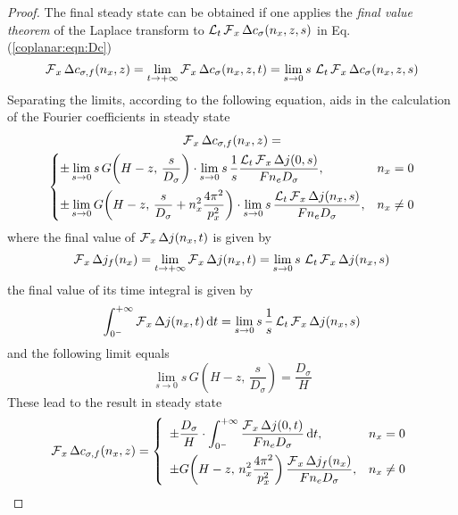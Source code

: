 \begin{proof}
	The final steady state can be obtained
	if one applies the \emph{final value theorem} of the Laplace transform
	to $\operatorname{\mathcal{L}}_{t} \operatorname{\mathcal{F}}_{x} \Delta c_{\sigma}(n_{x},z,s)$ in Eq. (\ref{coplanar:eqn:Dc})
	\begin{equation}
		\operatorname{\mathcal{F}}_{x} \Delta c_{\sigma,f}(n_{x},z) =
		\lim_{t \to +\infty} \operatorname{\mathcal{F}}_{x} \Delta c_{\sigma}(n_{x},z,t) =
		\lim_{s \to 0} s\, \operatorname{\mathcal{L}}_{t} \operatorname{\mathcal{F}}_{x} \Delta c_{\sigma}(n_{x},z,s)
	\end{equation}
	Separating the limits, according to the following equation,
	aids in the calculation of the Fourier coefficients in steady state
	\begin{multline}
		\operatorname{\mathcal{F}}_{x} \Delta c_{\sigma,f}(n_{x},z) = \\
		\begin{cases}
			\displaystyle
			\pm \lim_{s \to 0} s\, G\!\left(H-z,\, \frac{s}{D_{\sigma}}\right)
			\cdot \lim_{s \to 0} s\, \frac{1}{s}
			\frac{\operatorname{\mathcal{L}}_{t} \operatorname{\mathcal{F}}_{x} \Delta j(0,s)}{F n_{e} D_{\sigma}},
			& n_{x} = 0
			\\[1em]
			\displaystyle
			\pm \lim_{s \to 0} G\!\left(H-z,\, \frac{s}{D_{\sigma}}
			+ n_{x}^{2} \frac{4\pi^{2}}{p_{x}^{2}}\right)
			\cdot \lim_{s \to 0} s\,
			\frac{\operatorname{\mathcal{L}}_{t} \operatorname{\mathcal{F}}_{x} \Delta j(n_{x},s)}{F n_{e} D_{\sigma}},
			& n_{x} \neq 0
		\end{cases}
	\end{multline}
	where the final value of $\operatorname{\mathcal{F}}_{x} \Delta j(n_{x},t)$ is given by
	\begin{equation}
		\operatorname{\mathcal{F}}_{x} \Delta j_{f}(n_{x}) =
		\lim_{t \to +\infty} \operatorname{\mathcal{F}}_{x} \Delta j(n_{x},t) =
		\lim_{s \to 0} s\, \operatorname{\mathcal{L}}_{t} \operatorname{\mathcal{F}}_{x} \Delta j(n_{x},s)
	\end{equation}
	the final value of its time integral is given by
	\begin{equation}
		\int_{0^{-}}^{+\infty} \operatorname{\mathcal{F}}_{x} \Delta j(n_{x},t) \,\mathrm{d}t =
		\lim_{s \to 0} s\, \frac{1}{s} \operatorname{\mathcal{L}}_{t} \operatorname{\mathcal{F}}_{x} \Delta j(n_{x},s)
	\end{equation}
	and the following limit equals
	\begin{equation}
		\lim_{s \to 0} s\, G\!\left(H-z,\, \frac{s}{D_{\sigma}}\right) =
		\frac{D_{\sigma}}{H}
	\end{equation}
	These lead to the result in steady state
	\begin{equation}
		\operatorname{\mathcal{F}}_{x} \Delta c_{\sigma,f}(n_{x},z) =
		\left\{
			\begin{array}{ll}
				\displaystyle
				\pm \frac{D_{\sigma}}{H} \cdot
				\int_{0^{-}}^{+\infty}
				\frac{\operatorname{\mathcal{F}}_{x} \Delta j(0,t)}{F n_{e} D_{\sigma}}
				\,\mathrm{d}t, & n_{x} = 0
				\\[1em]
				\displaystyle
				\pm G\!\left(H-z,\, n_{x}^{2} \frac{4\pi^{2}}{p_{x}^{2}}\right)
				\frac{\operatorname{\mathcal{F}}_{x} \Delta j_{f}(n_{x})}{F n_{e} D_{\sigma}}, & n_{x} \neq 0
			\end{array}
		\right.
	\end{equation}


\end{proof}
